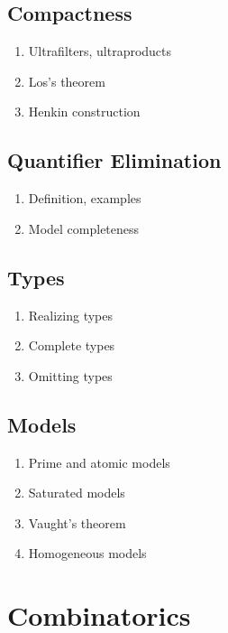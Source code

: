 \documentclass{article}
\begin{document}
\subsection{Compactness} 
\begin{enumerate}
  \item Ultrafilters, ultraproducts
  \item Los's theorem
  \item Henkin construction
\end{enumerate}

\subsection{Quantifier Elimination} 
\begin{enumerate}
  \item Definition, examples
  \item Model completeness
\end{enumerate}

\subsection{Types} 
\begin{enumerate}
  \item Realizing types
  \item Complete types
  \item Omitting types
\end{enumerate}

\subsection{Models} 
\begin{enumerate}
  \item Prime and atomic models
  \item Saturated models
  \item Vaught's theorem
  \item Homogeneous models
\end{enumerate}

\section{Combinatorics}
\end{document}
